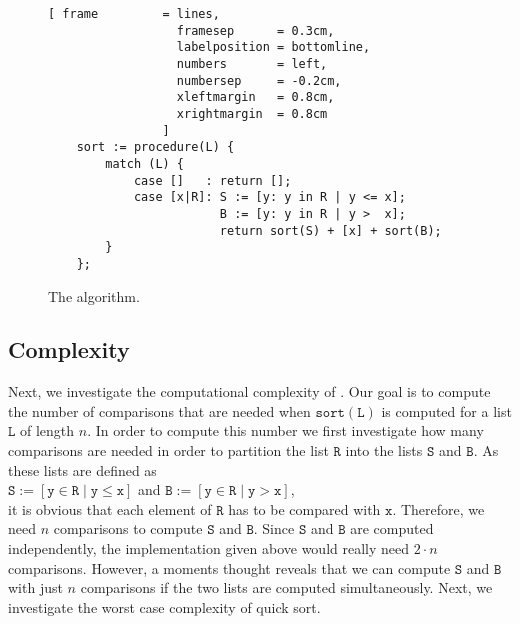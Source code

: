 \begin{figure}[!ht]
  \centering
\begin{Verbatim}[ frame         = lines, 
                  framesep      = 0.3cm, 
                  labelposition = bottomline,
                  numbers       = left,
                  numbersep     = -0.2cm,
                  xleftmargin   = 0.8cm,
                  xrightmargin  = 0.8cm
                ]
    sort := procedure(L) {
        match (L) {
            case []   : return [];
            case [x|R]: S := [y: y in R | y <= x];
                        B := [y: y in R | y >  x];
                        return sort(S) + [x] + sort(B);
        }
    };
\end{Verbatim}
\vspace*{-0.3cm}
  \caption{The  algorithm.}
  \label{fig:quick-sort.stlx}
\end{figure}

\subsection{Complexity}
Next, we investigate the computational complexity of .
Our goal is to compute the number of comparisons that are needed when
$\mathtt{sort}(\mathtt{L})$ is computed for a list $\mathtt{L}$ of length $n$.  In order to compute this number we
first investigate how many comparisons are needed in order to partition the list $\mathtt{R}$
into the lists $\mathtt{S}$ and $\mathtt{B}$.  As these lists are defined as 
\\[0.2cm]
\hspace*{1.3cm}
 $\mathtt{S} := [\mathtt{y} \in \mathtt{R} \mid \mathtt{y} \leq \mathtt{x}]$ \quad and \quad
 $\mathtt{B} := [\mathtt{y} \in \mathtt{R} \mid \mathtt{y} > \mathtt{x}]$,
\\[0.2cm]
it is obvious that each element of $\mathtt{R}$ has to be compared with $\mathtt{x}$.
Therefore, we need $n$ comparisons to compute $\mathtt{S}$ and $\mathtt{B}$.  Since $\mathtt{S}$ and
$\mathtt{B}$ are computed independently, the implementation given above 
would really need $2 \cdot n$ comparisons.  However, a moments thought reveals that we can compute $\mathtt{S}$ and $\mathtt{B}$
with just $n$ comparisons if the two lists are computed simultaneously.
Next, we investigate the worst case complexity of quick sort.

